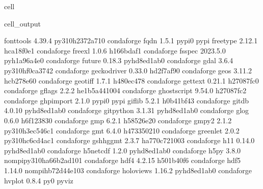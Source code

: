 \documentclass[letterpaper,table,10pt,english]{jupyterBook}
\begin{document}
\begin{sphinxuseclass}{cell}
\begin{sphinxVerbatimOutput}
\begin{sphinxuseclass}{cell_output}
\begin{sphinxVerbatim}[commandchars=\\\{\}]
fonttools                 4.39.4          py310h2372a71\PYGZus{}0    conda\PYGZhy{}forge
fqdn                      1.5.1                    pypi\PYGZus{}0    pypi
freetype                  2.12.1               hca18f0e\PYGZus{}1    conda\PYGZhy{}forge
freexl                    1.0.6                h166bdaf\PYGZus{}1    conda\PYGZhy{}forge
fsspec                    2023.5.0           pyh1a96a4e\PYGZus{}0    conda\PYGZhy{}forge
future                    0.18.3             pyhd8ed1ab\PYGZus{}0    conda\PYGZhy{}forge
gdal                      3.6.4           py310hf0ca374\PYGZus{}2    conda\PYGZhy{}forge
geckodriver               0.33.0               hd2f7af9\PYGZus{}0    conda\PYGZhy{}forge
geos                      3.11.2               hcb278e6\PYGZus{}0    conda\PYGZhy{}forge
geotiff                   1.7.1                h480ec47\PYGZus{}8    conda\PYGZhy{}forge
gettext                   0.21.1               h27087fc\PYGZus{}0    conda\PYGZhy{}forge
gflags                    2.2.2             he1b5a44\PYGZus{}1004    conda\PYGZhy{}forge
ghostscript               9.54.0               h27087fc\PYGZus{}2    conda\PYGZhy{}forge
ghp\PYGZhy{}import                2.1.0                    pypi\PYGZus{}0    pypi
giflib                    5.2.1                h0b41bf4\PYGZus{}3    conda\PYGZhy{}forge
gitdb                     4.0.10             pyhd8ed1ab\PYGZus{}0    conda\PYGZhy{}forge
gitpython                 3.1.31             pyhd8ed1ab\PYGZus{}0    conda\PYGZhy{}forge
glog                      0.6.0                h6f12383\PYGZus{}0    conda\PYGZhy{}forge
gmp                       6.2.1                h58526e2\PYGZus{}0    conda\PYGZhy{}forge
gmpy2                     2.1.2           py310h3ec546c\PYGZus{}1    conda\PYGZhy{}forge
gmt                       6.4.0               h4733502\PYGZus{}10    conda\PYGZhy{}forge
greenlet                  2.0.2           py310hc6cd4ac\PYGZus{}1    conda\PYGZhy{}forge
gshhg\PYGZhy{}gmt                 2.3.7             ha770c72\PYGZus{}1003    conda\PYGZhy{}forge
h11                       0.14.0             pyhd8ed1ab\PYGZus{}0    conda\PYGZhy{}forge
h5netcdf                  1.2.0              pyhd8ed1ab\PYGZus{}0    conda\PYGZhy{}forge
h5py                      3.8.0           nompi\PYGZus{}py310ha66b2ad\PYGZus{}101    conda\PYGZhy{}forge
hdf4                      4.2.15               h501b40f\PYGZus{}6    conda\PYGZhy{}forge
hdf5                      1.14.0          nompi\PYGZus{}hb72d44e\PYGZus{}103    conda\PYGZhy{}forge
holoviews                 1.16.2             pyhd8ed1ab\PYGZus{}0    conda\PYGZhy{}forge
hvplot                    0.8.4                      py\PYGZus{}0    pyviz

\end{sphinxVerbatim}
\end{sphinxuseclass}
\end{sphinxVerbatimOutput}
\end{sphinxuseclass}
\end{document}
